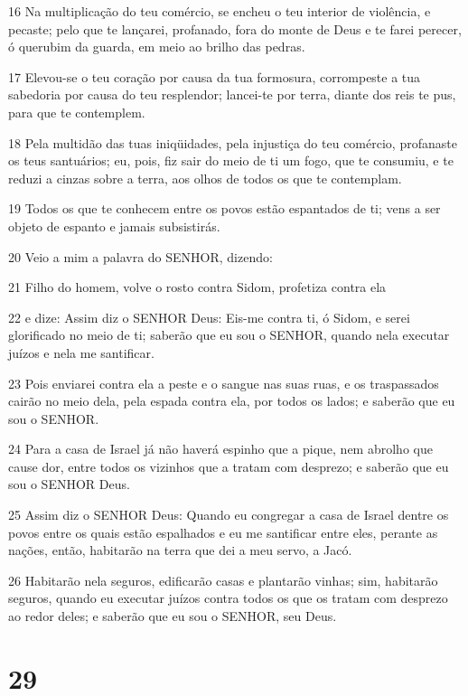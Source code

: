 \par 16 Na multiplicação do teu comércio, se encheu o teu interior de violência, e pecaste; pelo que te lançarei, profanado, fora do monte de Deus e te farei perecer, ó querubim da guarda, em meio ao brilho das pedras.
\par 17 Elevou-se o teu coração por causa da tua formosura, corrompeste a tua sabedoria por causa do teu resplendor; lancei-te por terra, diante dos reis te pus, para que te contemplem.
\par 18 Pela multidão das tuas iniqüidades, pela injustiça do teu comércio, profanaste os teus santuários; eu, pois, fiz sair do meio de ti um fogo, que te consumiu, e te reduzi a cinzas sobre a terra, aos olhos de todos os que te contemplam.
\par 19 Todos os que te conhecem entre os povos estão espantados de ti; vens a ser objeto de espanto e jamais subsistirás.
\par 20 Veio a mim a palavra do SENHOR, dizendo:
\par 21 Filho do homem, volve o rosto contra Sidom, profetiza contra ela
\par 22 e dize: Assim diz o SENHOR Deus: Eis-me contra ti, ó Sidom, e serei glorificado no meio de ti; saberão que eu sou o SENHOR, quando nela executar juízos e nela me santificar.
\par 23 Pois enviarei contra ela a peste e o sangue nas suas ruas, e os traspassados cairão no meio dela, pela espada contra ela, por todos os lados; e saberão que eu sou o SENHOR.
\par 24 Para a casa de Israel já não haverá espinho que a pique, nem abrolho que cause dor, entre todos os vizinhos que a tratam com desprezo; e saberão que eu sou o SENHOR Deus.
\par 25 Assim diz o SENHOR Deus: Quando eu congregar a casa de Israel dentre os povos entre os quais estão espalhados e eu me santificar entre eles, perante as nações, então, habitarão na terra que dei a meu servo, a Jacó.
\par 26 Habitarão nela seguros, edificarão casas e plantarão vinhas; sim, habitarão seguros, quando eu executar juízos contra todos os que os tratam com desprezo ao redor deles; e saberão que eu sou o SENHOR, seu Deus.

\chapter{29}

